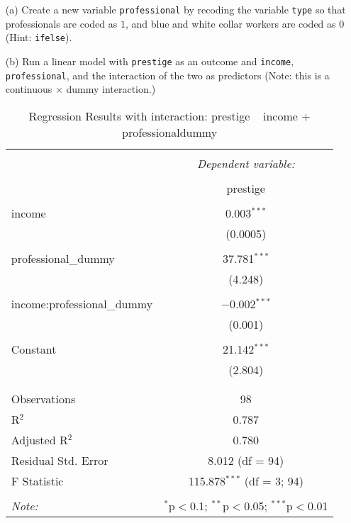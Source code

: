 \documentclass[12pt,letterpaper]{article}
\begin{document}
\newpage
\begin{enumerate}
	
	\item [(a)]
	Create a new variable \texttt{professional} by recoding the variable \texttt{type} so that professionals are coded as $1$, and blue and white collar workers are coded as $0$ (Hint: \texttt{ifelse}).
		
	\vspace{6cm}
	
	
	\item [(b)]
	Run a linear model with \texttt{prestige} as an outcome and \texttt{income}, \texttt{professional}, and the interaction of the two as predictors (Note: this is a continuous $\times$ dummy interaction.)
		
	
\begin{table}[!htbp] \centering 
	\caption{Regression Results with interaction: prestige ~ income + professionaldummy} 
	\label{} 
	\begin{tabular}{@{\extracolsep{5pt}}lc} 
		\\[-1.8ex]\hline 
		\hline \\[-1.8ex] 
		& \multicolumn{1}{c}{\textit{Dependent variable:}} \\ 
		\cline{2-2} 
		\\[-1.8ex] & prestige \\ 
		\hline \\[-1.8ex] 
		income & 0.003$^{***}$ \\ 
		& (0.0005) \\ 
		& \\ 
		professional\_dummy & 37.781$^{***}$ \\ 
		& (4.248) \\ 
		& \\ 
		income:professional\_dummy & $-$0.002$^{***}$ \\ 
		& (0.001) \\ 
		& \\ 
		Constant & 21.142$^{***}$ \\ 
		& (2.804) \\ 
		& \\ 
		\hline \\[-1.8ex] 
		Observations & 98 \\ 
		R$^{2}$ & 0.787 \\ 
		Adjusted R$^{2}$ & 0.780 \\ 
		Residual Std. Error & 8.012 (df = 94) \\ 
		F Statistic & 115.878$^{***}$ (df = 3; 94) \\ 
		\hline 
		\hline \\[-1.8ex] 
		\textit{Note:}  & \multicolumn{1}{r}{$^{*}$p$<$0.1; $^{**}$p$<$0.05; $^{***}$p$<$0.01} \\ 
	\end{tabular} 
\end{table} 


\end{enumerate}
\end{document}

